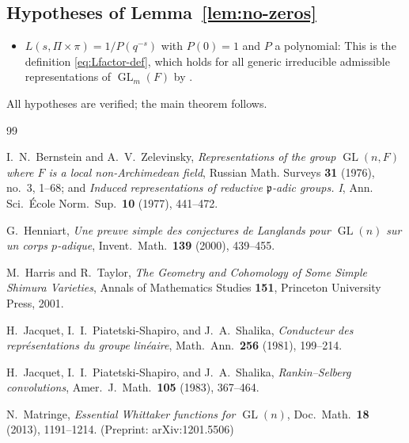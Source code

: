 \documentclass[12pt]{article}
\theoremstyle{definition}
\DeclareMathOperator{\GL}{GL}
\begin{document}
\subsection*{Hypotheses of Lemma~\ref{lem:no-zeros}}
\begin{itemize}
\item $L(s,\Pi\times\pi) = 1/P(q^{-s})$ with $P(0)=1$ and $P$ a polynomial:
  This is the definition \eqref{eq:Lfactor-def}, which holds for all generic
  irreducible admissible representations of $\GL_m(F)$ by \cite{JPSS83}. \checkmark
\end{itemize}

All hypotheses are verified; the main theorem follows.

\begin{thebibliography}{99}

  I.~N.~Bernstein and A.~V.~Zelevinsky,
  \emph{Representations of the group $\GL(n,F)$ where $F$ is a local
  non-Archimedean field},
  Russian Math. Surveys \textbf{31} (1976), no.~3, 1--68;
  and \emph{Induced representations of reductive $\mathfrak{p}$-adic groups. I},
  Ann. Sci.\ \'{E}cole Norm.\ Sup.\ \textbf{10} (1977), 441--472.

  G.~Henniart,
  \emph{Une preuve simple des conjectures de Langlands pour $\GL(n)$ sur un
  corps $p$-adique},
  Invent.\ Math.\ \textbf{139} (2000), 439--455.

  M.~Harris and R.~Taylor,
  \emph{The Geometry and Cohomology of Some Simple Shimura Varieties},
  Annals of Mathematics Studies \textbf{151},
  Princeton University Press, 2001.

  H.~Jacquet, I.~I.~Piatetski-Shapiro, and J.~A.~Shalika,
  \emph{Conducteur des repr\'{e}sentations du groupe lin\'{e}aire},
  Math.\ Ann.\ \textbf{256} (1981), 199--214.

  H.~Jacquet, I.~I.~Piatetski-Shapiro, and J.~A.~Shalika,
  \emph{Rankin--Selberg convolutions},
  Amer.\ J.\ Math.\ \textbf{105} (1983), 367--464.

  N.~Matringe,
  \emph{Essential Whittaker functions for $\GL(n)$},
  Doc.\ Math.\ \textbf{18} (2013), 1191--1214.
  (Preprint: arXiv:1201.5506)

\end{thebibliography}
\end{document}
